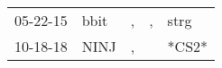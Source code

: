 \begin{supertabular}{p{0.07\textwidth}p{0.06\textwidth}p{0.02\textwidth}p{0.02\textwidth}p{0.06\textwidth}}
 05-22-15\textsuperscript{} &  bbit\textsuperscript{} &  , &  , &  strg\textsuperscript{} \\
 10-18-18\textsuperscript{} &  NINJ\textsuperscript{} &  , &    &                   *CS2* \\
\end{supertabular}
